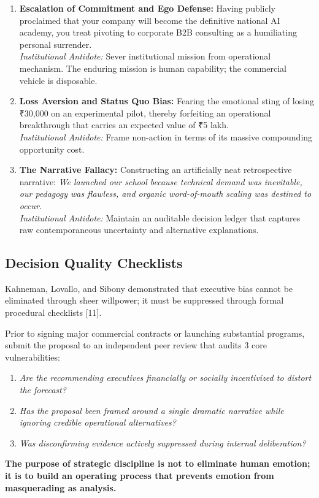 \begin{enumerate}[leftmargin=12pt,itemsep=3pt,topsep=2pt,parsep=0pt]
  \item \textbf{Escalation of Commitment and Ego Defense:} Having publicly proclaimed that your company will become the definitive national AI academy, you treat pivoting to corporate B2B consulting as a humiliating personal surrender. \\
  \textit{Institutional Antidote:} Sever institutional mission from operational mechanism. The enduring mission is human capability; the commercial vehicle is disposable.

  \item \textbf{Loss Aversion and Status Quo Bias:} Fearing the emotional sting of losing ₹30,000 on an experimental pilot, thereby forfeiting an operational breakthrough that carries an expected value of ₹5 lakh. \\
  \textit{Institutional Antidote:} Frame non-action in terms of its massive compounding opportunity cost.

  \item \textbf{The Narrative Fallacy:} Constructing an artificially neat retrospective narrative: \textit{We launched our school because technical demand was inevitable, our pedagogy was flawless, and organic word-of-mouth scaling was destined to occur.} \\
  \textit{Institutional Antidote:} Maintain an auditable decision ledger that captures raw contemporaneous uncertainty and alternative explanations.
\end{enumerate}

\subsection{Decision Quality Checklists}

Kahneman, Lovallo, and Sibony demonstrated that executive bias cannot be eliminated through sheer willpower; it must be suppressed through formal procedural checklists [11].

Prior to signing major commercial contracts or launching substantial programs, submit the proposal to an independent peer review that audits 3 core vulnerabilities:
\begin{enumerate}[leftmargin=12pt,itemsep=1pt,topsep=1pt,parsep=0pt]
  \item \textit{Are the recommending executives financially or socially incentivized to distort the forecast?}
  \item \textit{Has the proposal been framed around a single dramatic narrative while ignoring credible operational alternatives?}
  \item \textit{Was disconfirming evidence actively suppressed during internal deliberation?}
\end{enumerate}

\textbf{The purpose of strategic discipline is not to eliminate human emotion; it is to build an operating process that prevents emotion from masquerading as analysis.}
